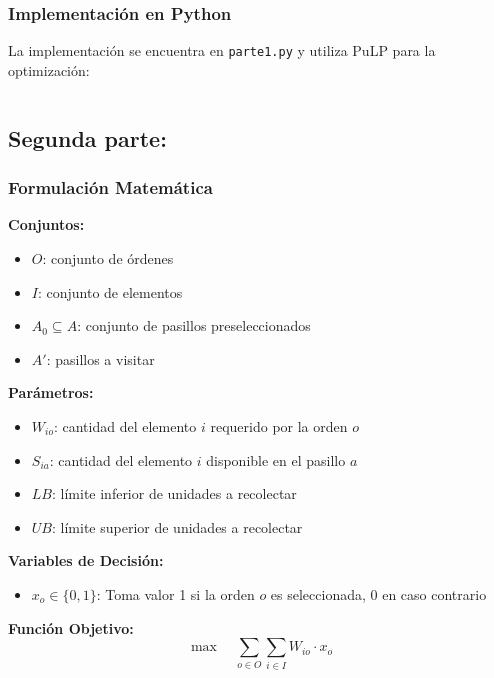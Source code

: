\documentclass[a4paper,12pt]{article}
\begin{document}
\subsubsection{Implementación en Python}

La implementación se encuentra en \texttt{parte1.py} y utiliza PuLP para la optimización:

\begin{lstlisting}[language=Python, caption=Implementación clave de la parte 1]

\end{lstlisting}

\subsection{Segunda parte:}
\label{sec:variante2}

\subsubsection{Formulación Matemática}

\textbf{Conjuntos:}
\begin{itemize}
    \item $O$: conjunto de órdenes
    \item $I$: conjunto de elementos
    \item $A_0 \subseteq A$: conjunto de pasillos preseleccionados
    \item $A'$: pasillos a visitar
\end{itemize}

\textbf{Parámetros:}
\begin{itemize}
    \item $W_{io}$: cantidad del elemento $i$ requerido por la orden $o$
    \item $S_{ia}$: cantidad del elemento $i$ disponible en el pasillo $a$
    \item $LB$: límite inferior de unidades a recolectar
    \item $UB$: límite superior de unidades a recolectar
\end{itemize}

\textbf{Variables de Decisión:}
\begin{itemize}
    \item $x_o \in \{0,1\}$: Toma valor 1 si la orden $o$ es seleccionada, 0 en caso contrario
\end{itemize}

\textbf{Función Objetivo:}
\begin{equation}
\operatorname{max} \quad \sum_{o \in O} \sum_{i \in I} W_{io} \cdot x_o
\end{equation}
\end{document}

